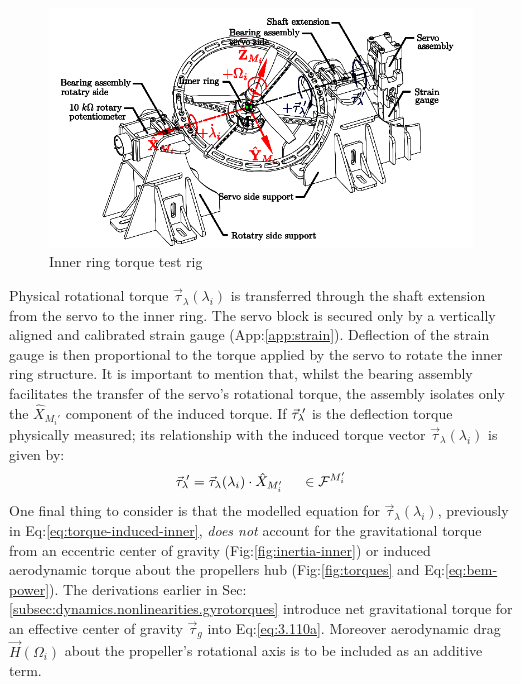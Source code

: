 \begin{figure}[htpb]
\centering
\includegraphics[width=\textwidth]{figs/torque-inner}
\caption{Inner ring torque test rig}
\label{fig:torque-inner}
\vspace{-12pt}
\end{figure}
\par
Physical rotational torque $\vec{\tau}_\lambda(\lambda_i)$ is transferred through the shaft extension from the servo to the inner ring. The servo block is secured only by a vertically aligned and calibrated strain gauge (App:\ref{app:strain}). Deflection of the strain gauge is then proportional to the torque applied by the servo to rotate the inner ring structure. It is important to mention that, whilst the bearing assembly facilitates the transfer of the servo's rotational torque, the assembly isolates only the $\hat{X}_{M_i'}$ component of the induced torque. If $\vec{\tau}_{\lambda}\text{}\hspace{-2pt}'$ is the deflection torque physically measured; its relationship with the induced torque vector $\vec{\tau}_{\lambda}(\lambda_i)$ is given by:
\begin{equation}\label{eq:tau-lambda-prime}
\vec{\tau}_{\lambda}\text{}\hspace{-2pt}'=\vec{\tau}_{\lambda}(\lambda_i)\cdot\hat{X}_{M_i'}~~~~\in\mathcal{F}^{M_i'}
\end{equation}
One final thing to consider is that the modelled equation for $\vec{\tau}_\lambda(\lambda_i)$, previously in Eq:\ref{eq:torque-induced-inner}, \emph{does not} account for the gravitational torque from an eccentric center of gravity (Fig:\ref{fig:inertia-inner}) or induced aerodynamic torque about the propellers hub (Fig:\ref{fig:torques} and Eq:\ref{eq:bem-power}). The derivations earlier in Sec:\ref{subsec:dynamics.nonlinearities.gyrotorques} introduce net gravitational torque for an effective center of gravity $\vec{\tau}_g$ into Eq:\ref{eq:3.110a}. Moreover aerodynamic drag $\vec{H}(\Omega_i)$ about the propeller's rotational axis is to be included as an additive term. 

